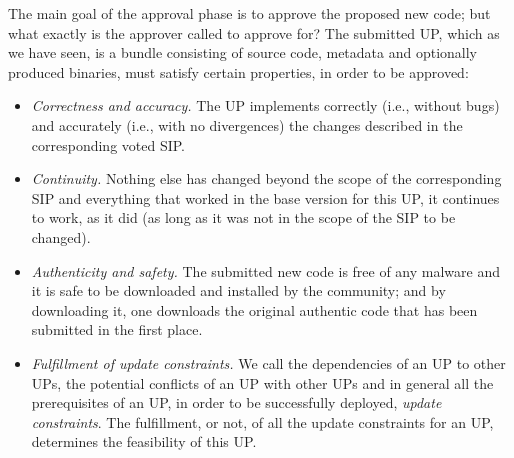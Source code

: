 The main goal of the approval phase is to approve the proposed new code; but what exactly is the approver called to approve for? The submitted UP, which as we have seen, is a bundle consisting of source code, metadata and optionally produced binaries, must satisfy certain properties, in order to be approved:
\begin{itemize}
\item
\emph{Correctness and accuracy.} The UP implements correctly (i.e., without bugs) and accurately (i.e., with no divergences) the changes described in the corresponding voted SIP.

\item \emph{Continuity.} Nothing else has changed beyond the scope of the corresponding SIP and everything that worked in the base version for this UP, it continues to work, as it did (as long as it was not in the scope of the SIP to be changed).

\item \emph{Authenticity and safety.} The submitted new code is free of any malware and it is safe to be downloaded and installed by the community; and by downloading it, one downloads the original authentic code that has been submitted in the first place.

\item \emph{Fulfillment of update constraints.} We call the dependencies of an UP to other UPs, the potential conflicts of an UP with other UPs and in general all the prerequisites of an UP, in order to be successfully deployed, \emph{update constraints}. The fulfillment, or not, of all the update constraints for an UP, determines the feasibility of this UP.
\end{itemize}

